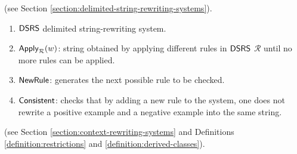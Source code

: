  (see Section \ref{section:delimited-string-rewriting-systems}).

\begin{enumerate}[]
\item $\textup{\sf DSRS}$ delimited string-rewriting system.
\item $\textup{\sf Apply}_{\mathcal{R}}(w)$: string obtained by applying different rules in $\textup{\sf DSRS}$ $\mathcal{R}$ until no more rules can be applied.
\item $\textup{\sf NewRule}$: generates the next possible rule to be checked.
\item $\textup{\sf Consistent}$: checks that by adding a new rule to the system, one does not rewrite a positive example and a negative example into the same string.
\end{enumerate}

 (see Section \ref{section:context-rewriting-systems} and Definitions \ref{definition:restrictions} and \ref{definition:derived-classes}).

